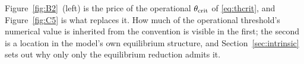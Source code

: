 \begin{remark}
Figure~\ref{fig:B2}~(left) is the price of the operational $\theta_{\mathrm{crit}}$ of \eqref{eq:thcrit}, and
Figure~\ref{fig:C5} is what replaces it. How much of the operational threshold's numerical
value is inherited from the convention is visible in the first; the second is a location in
the model's own equilibrium structure, and Section~\ref{sec:intrinsic} sets out why only
only the equilibrium reduction admits it.
\end{remark}

